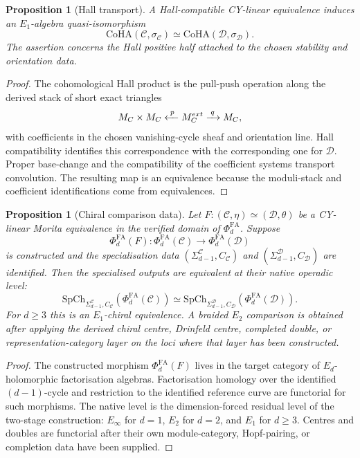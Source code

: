 \documentclass[11pt]{amsart}
\newtheorem{proposition}[theorem]{Proposition}
\newcommand{\CoHA}{\mathrm{CoHA}}
\newcommand{\cC}{\mathcal{C}}
\newcommand{\cD}{\mathcal{D}}
\newcommand{\PhiFA}{\Phi^{\mathrm{FA}}}
\newcommand{\SpCh}{\mathrm{SpCh}}
\begin{document}
\begin{proposition}[Hall transport]
\label{prop:hall-transport}
A Hall-compatible CY-linear equivalence induces an $E_1$-algebra
quasi-isomorphism
\[
  \CoHA(\cC,\sigma_\cC)
  \simeq
  \CoHA(\cD,\sigma_\cD).
\]
The assertion concerns the Hall positive half attached to the chosen
stability and orientation data.
\end{proposition}

\begin{proof}
The cohomological Hall product is the pull-push operation along the
derived stack of short exact triangles
\[
  \cM_\cC\times\cM_\cC
  \xleftarrow{\;p\;}
  \cM_\cC^{\mathrm{ext}}
  \xrightarrow{\;q\;}
  \cM_\cC,
\]
with coefficients in the chosen vanishing-cycle sheaf and orientation
line.  Hall compatibility identifies this correspondence with the
corresponding one for $\cD$.  Proper base-change and the compatibility
of the coefficient systems transport convolution.  The resulting map is
an equivalence because the moduli-stack and coefficient identifications
come from equivalences.
\end{proof}

\begin{proposition}[Chiral comparison data]
\label{prop:chiral-comparison-data}
Let $F\colon(\cC,\eta)\simeq(\cD,\theta)$ be a CY-linear Morita
equivalence in the verified domain of $\PhiFA_d$.  Suppose
\[
  \PhiFA_d(F)\colon \PhiFA_d(\cC)\longrightarrow\PhiFA_d(\cD)
\]
is constructed and the specialisation data
$(\Sigma_{d-1}^{\cC},C_\cC)$ and $(\Sigma_{d-1}^{\cD},C_\cD)$ are
identified.  Then the specialised outputs are equivalent at their
native operadic level:
\[
  \SpCh_{\Sigma_{d-1}^{\cC},C_\cC}(\PhiFA_d(\cC))
  \simeq
  \SpCh_{\Sigma_{d-1}^{\cD},C_\cD}(\PhiFA_d(\cD)).
\]
For $d\geq3$ this is an $E_1$-chiral equivalence.  A braided $E_2$
comparison is obtained after applying the derived chiral centre,
Drinfeld centre, completed double, or representation-category layer on
the loci where that layer has been constructed.
\end{proposition}

\begin{proof}
The constructed morphism $\PhiFA_d(F)$ lives in the target category of
$E_d$-holomorphic factorisation algebras.  Factorisation homology over
the identified $(d-1)$-cycle and restriction to the identified reference
curve are functorial for such morphisms.  The native level is the
dimension-forced residual level of the two-stage construction:
$E_\infty$ for $d=1$, $E_2$ for $d=2$, and $E_1$ for $d\geq3$.
Centres and doubles are functorial after their own module-category,
Hopf-pairing, or completion data have been supplied.
\end{proof}
\end{document}
